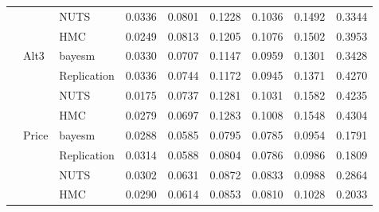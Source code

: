 \begin{tabular}{lllcccccc}
 &  & NUTS & 0.0336 & 0.0801 & 0.1228 & 0.1036 & 0.1492 & 0.3344 \\
 &  & HMC & 0.0249 & 0.0813 & 0.1205 & 0.1076 & 0.1502 & 0.3953 \\
 & Alt3 & bayesm & 0.0330 & 0.0707 & 0.1147 & 0.0959 & 0.1301 & 0.3428 \\
 &  & Replication & 0.0336 & 0.0744 & 0.1172 & 0.0945 & 0.1371 & 0.4270 \\
 &  & NUTS & 0.0175 & 0.0737 & 0.1281 & 0.1031 & 0.1582 & 0.4235 \\
 &  & HMC & 0.0279 & 0.0697 & 0.1283 & 0.1008 & 0.1548 & 0.4304 \\
 & Price & bayesm & 0.0288 & 0.0585 & 0.0795 & 0.0785 & 0.0954 & 0.1791 \\
 &  & Replication & 0.0314 & 0.0588 & 0.0804 & 0.0786 & 0.0986 & 0.1809 \\
 &  & NUTS & 0.0302 & 0.0631 & 0.0872 & 0.0833 & 0.0988 & 0.2864 \\
 &  & HMC & 0.0290 & 0.0614 & 0.0853 & 0.0810 & 0.1028 & 0.2033 \\
\bottomrule
\end{tabular}
